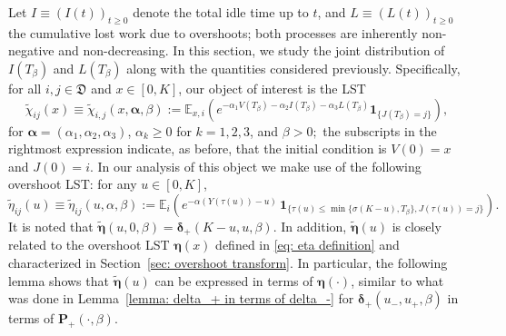 \documentclass[reqno,12pt]{amsart}
\newcommand{\e}{\mathbb{E}}
\newcommand{\bs}{\boldsymbol}
\newcommand{\defD}{{\mathfrak D}}
\begin{document}
{Let $I\equiv (I(t))_{t\geqslant0}$ denote the total idle time up to $t$, and $L\equiv (L(t))_{t\geqslant0}$ the cumulative lost work due to overshoots; both processes are inherently non-negative and non-decreasing.  
In this section, we study the joint distribution of $I(T_\beta)$ and $L(T_\beta)$ along with the quantities considered previously. Specifically, for all $i,j\in\defD $ and $x\in[0,K]$, our object of interest is the LST
\begin{equation}
    \tilde\chi_{ij}(x) \equiv \tilde\chi_{i,j}(x,\bs\alpha,\beta) := \e_{x,i}\left( e^{-\alpha_1 V(T_\beta) - \alpha_2 I(T_\beta) - \alpha_3 L(T_\beta)} \bs{1}_{\{J(T_\beta)=j\}} \right),
\end{equation}
for $\bs\alpha=(\alpha_1,\alpha_2,\alpha_3)$, $\alpha_k\geqslant0$ for $k=1,2,3$, and $\beta > 0;$ the subscripts in the rightmost expression indicate, as before, that the initial condition is $V(0)=x$ and $J(0)=i$. 
In our analysis of this object we make use of the following overshoot LST: for any $u\in[0,K]$,
\begin{equation}
    \tilde{\eta}_{ij}(u) \equiv \tilde{\eta}_{ij}(u, \alpha, \beta) := {\mathbb E}_{i}\left(e^{-\alpha \left(Y(\tau(u)) - u\right)}\,\bs{1}_{\{\tau(u) \leqslant \min\{\sigma(K-u), T_{\beta}\}, J(\tau(u)) = j\}}\right).
\end{equation}
It is noted that $\tilde{\bs \eta}(u,0,\beta) = {\bs \delta}_+(K-u,u,\beta)$.  
In addition, $\tilde{\bs \eta}(u)$ is closely related to the overshoot LST $\bs{\eta}(x)$ defined in \eqref{eq: eta definition} and characterized in Section~\ref{sec: overshoot transform}. In particular, the following lemma shows that $\tilde{\bs \eta}(u)$ can be expressed in terms of $\bs{\eta}(\cdot)$, similar to what was done in Lemma~\ref{lemma: delta_+ in terms of delta_-} for ${\bs \delta}_{+}(u_-, u_+, \beta)$ in terms of ${\bs P}_+(\cdot, \beta)$.

}
\end{document}
